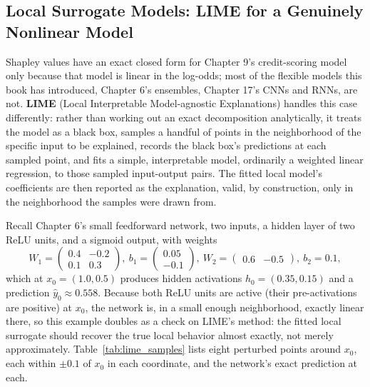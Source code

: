 \documentclass[../ai_in_finance]{subfiles}
\begin{document}
\subsection{Local Surrogate Models: LIME for a Genuinely Nonlinear Model}
\label{sec:lime-explain}

Shapley values have an exact closed form for Chapter 9's credit-scoring model only because that model is linear in the log-odds; most of the flexible models this book has introduced, Chapter 6's ensembles, Chapter 17's CNNs and RNNs, are not. \textbf{LIME} (Local Interpretable Model-agnostic Explanations) handles this case differently: rather than working out an exact decomposition analytically, it treats the model as a black box, samples a handful of points in the neighborhood of the specific input to be explained, records the black box's predictions at each sampled point, and fits a simple, interpretable model, ordinarily a weighted linear regression, to those sampled input-output pairs. The fitted local model's coefficients are then reported as the explanation, valid, by construction, only in the neighborhood the samples were drawn from.

Recall Chapter 6's small feedforward network, two inputs, a hidden layer of two ReLU units, and a sigmoid output, with weights
$$W_1 = \begin{pmatrix}0.4 & -0.2\\ 0.1 & 0.3\end{pmatrix},\ b_1 = \begin{pmatrix}0.05\\-0.1\end{pmatrix},  \ W_2 = \begin{pmatrix}0.6 & -0.5\end{pmatrix}, \ b_2 = 0.1,$$
which at $x_0 = (1.0, 0.5)$ produces hidden activations $h_0 = (0.35, 0.15)$ and a prediction $\hat y_0 \approx 0.558$. Because both ReLU units are active (their pre-activations are positive) at $x_0$, the network is, in a small enough neighborhood, exactly linear there, so this example doubles as a check on LIME's method: the fitted local surrogate should recover the true local behavior almost exactly, not merely approximately. Table~\ref{tab:lime_samples} lists eight perturbed points around $x_0$, each within $\pm 0.1$ of $x_0$ in each coordinate, and the network's exact prediction at each.
\end{document}
